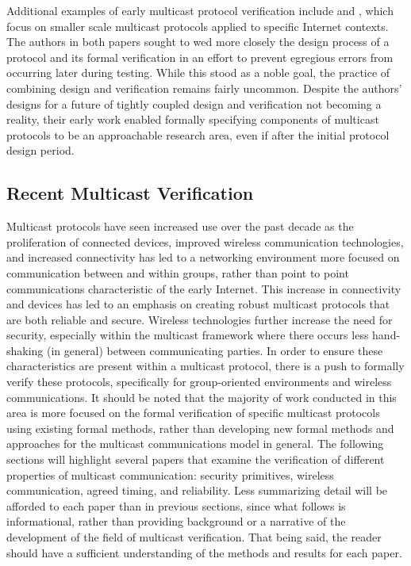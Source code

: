 \documentclass[10pt, journal]{IEEEtran}
\begin{document}
\bigbreak
Additional examples of early multicast protocol verification include \cite{Callahan1995} and \cite{Baptista1990}, which focus on smaller scale multicast protocols applied to specific Internet contexts. The authors in both papers sought to wed more closely the design process of a protocol and its formal verification in an effort to prevent egregious errors from occurring later during testing. While this stood as a noble goal, the practice of combining design and verification remains fairly uncommon. Despite the authors' designs for a future of tightly coupled design and verification not becoming a reality, their early work enabled formally specifying components of multicast protocols to be an approachable research area, even if after the initial protocol design period.
\bigbreak
\subsection{Recent Multicast Verification}
Multicast protocols have seen increased use over the past decade as the proliferation of connected devices, improved wireless communication technologies, and increased connectivity has led to a networking environment more focused on communication between and within groups, rather than point to point communications characteristic of the early Internet. This increase in connectivity and devices has led to an emphasis on creating robust multicast protocols that are both reliable and secure. Wireless technologies further increase the need for security, especially within the multicast framework where there occurs less hand-shaking (in general) between communicating parties. In order to ensure these characteristics are present within a multicast protocol, there is a push to formally verify these protocols, specifically for group-oriented environments and wireless communications. It should be noted that the majority of work conducted in this area is more focused on the formal verification of specific multicast protocols using existing formal methods, rather than developing new formal methods and approaches for the multicast communications model in general.
\bigbreak
The following sections will highlight several papers that examine the verification of different properties of multicast communication: security primitives, wireless communication, agreed timing, and reliability. Less summarizing detail will be afforded to each paper than in previous sections, since what follows is informational, rather than providing background or a narrative of the development of the field of multicast verification. That being said, the reader should have a sufficient understanding of the methods and results for each paper.
\bigbreak
\end{document}
